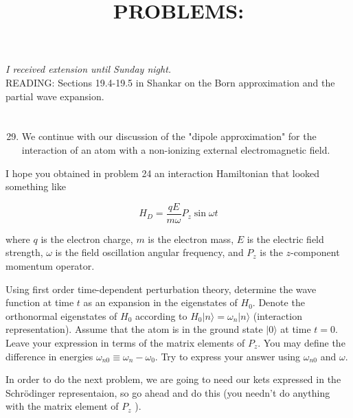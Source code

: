 \documentclass[12pt]{article}
\title{PROBLEMS: }
\author{}
\date{}
\begin{document}
\maketitle
\emph{I received extension until Sunday night.}\\
READING: Sections 19.4-19.5 in Shankar on the Born approximation and the partial wave expansion.
\section{}
\begin{enumerate}
  \setcounter{enumi}{28}
  \item We continue with our discussion of the "dipole approximation" for the interaction of an atom with a non-ionizing external electromagnetic field.
\end{enumerate}

I hope you obtained in problem 24 an interaction Hamiltonian that looked something like


\begin{equation*}
H_{D}=\frac{q E}{m \omega} P_{z} \sin \omega t \tag{1}
\end{equation*}


where $q$ is the electron charge, $m$ is the electron mass, $E$ is the electric field strength, $\omega$ is the field oscillation angular frequency, and $P_{z}$ is the $z$-component momentum operator.

Using first order time-dependent perturbation theory, determine the wave function at time $t$ as an expansion in the eigenstates of $H_{0}$. Denote the orthonormal eigenstates of $H_{0}$ according to $H_{0}|n\rangle=\omega_{n}|n\rangle$ (interaction representation). Assume that the atom is in the ground state $|0\rangle$ at time $t=0$. Leave your expression in terms of the matrix elements of $P_{z}$. You may define the difference in energies $\omega_{n 0} \equiv \omega_{n}-\omega_{0}$. Try to express your answer using $\omega_{n 0}$ and $\omega$.

In order to do the next problem, we are going to need our kets expressed in the Schrödinger representaion, so go ahead and do this (you needn't do anything with the matrix element of $P_{z}$ ).
\end{document}
